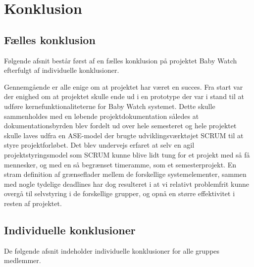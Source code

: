 \chapter{Konklusion}
\section{Fælles konklusion}
Følgende afsnit består først af en fælles konklusion på projektet Baby Watch efterfulgt af individuelle konklusioner.

Gennemgående er alle enige om at projektet har været en succes. Fra start var der enighed om at projektet skulle ende ud i en prototype der var i stand til at udføre kernefunktionaliteterne for Baby Watch systemet. Dette skulle sammenholdes med en løbende projektdokumentation således at dokumentationsbyrden blev fordelt ud over hele semesteret og hele projektet skulle laves udfra en ASE-model der brugte udviklingsværktøjet SCRUM til at styre projektforløbet. Det blev undervejs erfaret at selv en agil projektstyringsmodel som SCRUM kunne blive lidt tung for et projekt med så få mennesker, og med en så begrænset timeramme, som et semesterprojekt. En stram definition af grænseflader mellem de forskellige systemelementer, sammen med nogle tydelige deadlines har dog resulteret i at vi relativt problemfrit kunne overgå til selvstyring i de forskellige grupper, og opnå en større effektivitet i resten af projektet. 


\section{Individuelle konklusioner}

De følgende afsnit indeholder individuelle konklusioner for alle gruppes medlemmer.












